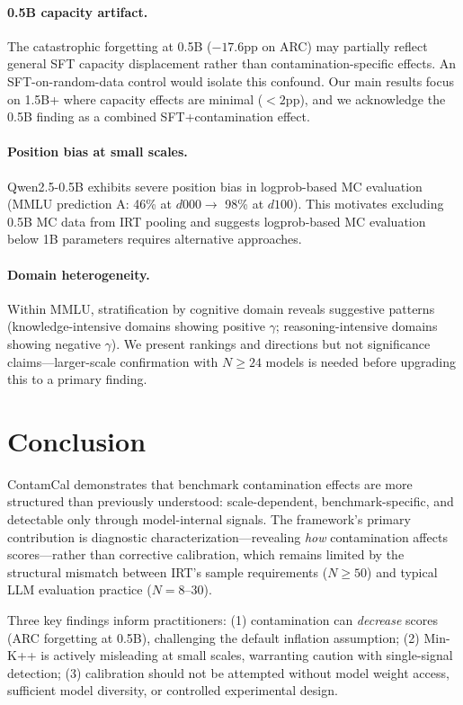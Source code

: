 \documentclass[11pt,a4paper]{article}
\begin{document}
\paragraph{0.5B capacity artifact.} The catastrophic forgetting at 0.5B ($-17.6$pp on ARC) may partially reflect general SFT capacity displacement rather than contamination-specific effects. An SFT-on-random-data control would isolate this confound. Our main results focus on 1.5B+ where capacity effects are minimal ($< 2$pp), and we acknowledge the 0.5B finding as a combined SFT+contamination effect.

\paragraph{Position bias at small scales.} Qwen2.5-0.5B exhibits severe position bias in logprob-based MC evaluation (MMLU prediction A: 46\% at $d000 \to$ 98\% at $d100$). This motivates excluding 0.5B MC data from IRT pooling and suggests logprob-based MC evaluation below 1B parameters requires alternative approaches.

\paragraph{Domain heterogeneity.} Within MMLU, stratification by cognitive domain reveals suggestive patterns (knowledge-intensive domains showing positive $\gamma$; reasoning-intensive domains showing negative $\gamma$). We present rankings and directions but not significance claims---larger-scale confirmation with $N \geq 24$ models is needed before upgrading this to a primary finding.

\section{Conclusion}

ContamCal demonstrates that benchmark contamination effects are more structured than previously understood: scale-dependent, benchmark-specific, and detectable only through model-internal signals. The framework's primary contribution is diagnostic characterization---revealing \emph{how} contamination affects scores---rather than corrective calibration, which remains limited by the structural mismatch between IRT's sample requirements ($N \geq 50$) and typical LLM evaluation practice ($N = 8$--$30$).

Three key findings inform practitioners: (1) contamination can \emph{decrease} scores (ARC forgetting at 0.5B), challenging the default inflation assumption; (2) Min-K++ is actively misleading at small scales, warranting caution with single-signal detection; (3) calibration should not be attempted without model weight access, sufficient model diversity, or controlled experimental design.
\end{document}
